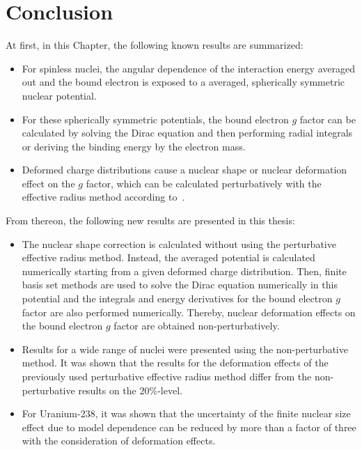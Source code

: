 \section{Conclusion}
At first, in this Chapter, the following known results are summarized:
\begin{itemize}
\item For spinless nuclei, the angular dependence of the interaction energy averaged out and the bound electron is exposed to a averaged, spherically symmetric nuclear potential.
\item For these spherically symmetric potentials, the bound electron $g$ factor can be calculated by solving the Dirac equation and then performing radial integrals or deriving the binding energy by the electron mass.
\item Deformed charge distributions cause a nuclear shape or nuclear deformation effect on the $g$ factor, which can be calculated perturbatively with the effective radius method according to~\cite{jacek2012}.
\end{itemize}
From thereon, the following new results are presented in this thesis:
\begin{itemize}
\item The nuclear shape correction is calculated without using the perturbative effective radius method. Instead, the averaged potential is calculated numerically starting from a given deformed charge distribution. Then, finite basis set methods are used to solve the Dirac equation numerically in this potential and the integrals and energy derivatives for the bound electron $g$ factor are also performed numerically. Thereby, nuclear deformation effects on the bound electron $g$ factor are obtained non-perturbatively.
\item Results for a wide range of nuclei were presented using the non-perturbative method. It was shown that the results for the deformation effects of the previously used perturbative effective radius method differ from the non-perturbative results on the $20\%$-level.
\item For Uranium-238, it was shown that the uncertainty of the finite nuclear size effect due to model dependence can be reduced by more than a factor of three with the consideration of deformation effects. 
\end{itemize}

